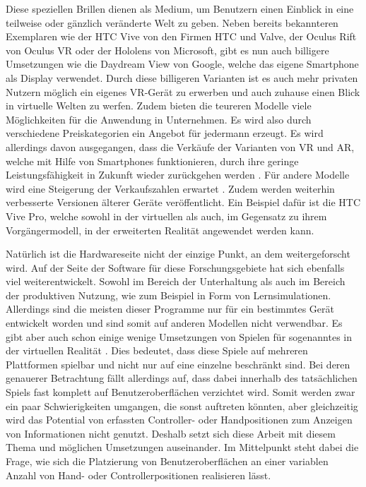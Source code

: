 	Diese speziellen Brillen dienen als Medium, um Benutzern einen Einblick in eine teilweise oder gänzlich veränderte Welt zu geben.
	Neben bereits bekannteren Exemplaren wie der HTC Vive von den Firmen HTC und Valve, der Oculus Rift von Oculus VR oder der Hololens von Microsoft, gibt es nun auch billigere Umsetzungen wie die Daydream View von Google, welche das eigene Smartphone als Display verwendet.
	Durch diese billigeren Varianten ist es auch mehr privaten Nutzern möglich ein eigenes VR-Gerät zu erwerben und auch zuhause einen Blick in virtuelle Welten zu werfen. Zudem bieten die teureren Modelle viele Möglichkeiten für die Anwendung in Unternehmen. Es wird also durch verschiedene Preiskategorien ein Angebot für jedermann erzeugt.
	Es wird allerdings davon ausgegangen, dass die Verkäufe der Varianten von VR und AR, welche mit Hilfe von Smartphones funktionieren, durch ihre geringe Leistungsfähigkeit in Zukunft wieder zurückgehen werden \cite{verkauf2}. Für andere Modelle wird eine Steigerung der Verkaufszahlen erwartet \cite{verkaufVR}\cite{verkauf2}.
	Zudem werden weiterhin verbesserte Versionen älterer Geräte veröffentlicht. Ein Beispiel dafür ist die HTC Vive Pro, welche sowohl in der virtuellen als auch, im Gegensatz zu ihrem Vorgängermodell, in der erweiterten Realität angewendet werden kann.

	Natürlich ist die Hardwareseite nicht der einzige Punkt, an dem weitergeforscht wird. Auf der Seite der Software für diese Forschungsgebiete hat sich ebenfalls viel weiterentwickelt. Sowohl im Bereich der Unterhaltung als auch im Bereich der produktiven Nutzung, wie zum Beispiel in Form von Lernsimulationen. Allerdings sind die meisten dieser Programme nur für ein bestimmtes Gerät entwickelt worden und sind somit auf anderen Modellen nicht verwendbar. Es gibt aber auch schon einige wenige Umsetzungen von Spielen für sogenanntes  in der virtuellen Realität \cite{crossCB}. Dies bedeutet, dass diese Spiele auf mehreren Plattformen spielbar und nicht nur auf eine einzelne beschränkt sind. Bei deren genauerer Betrachtung fällt allerdings auf, dass dabei innerhalb des tatsächlichen Spiels fast komplett auf Benutzeroberflächen verzichtet wird. Somit werden zwar ein paar Schwierigkeiten umgangen, die sonst auftreten könnten, aber gleichzeitig wird das Potential von erfassten Controller- oder Handpositionen zum Anzeigen von Informationen nicht genutzt. Deshalb setzt sich diese Arbeit mit diesem Thema und möglichen Umsetzungen auseinander. Im Mittelpunkt steht dabei die Frage, wie sich die Platzierung von Benutzeroberflächen an einer variablen Anzahl von Hand- oder Controllerpositionen realisieren lässt.
	
